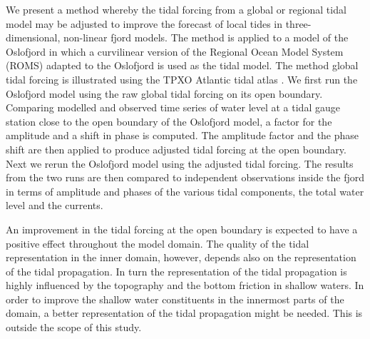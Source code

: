 We present a method whereby the tidal forcing from a global or regional tidal model may be adjusted to improve the forecast of local tides in three-dimensional, non-linear fjord models. 
The method is applied to a model of the Oslofjord in which a curvilinear version of the Regional Ocean Model System (ROMS) \citep{shchepetkin05,shchepetkin09,haidvogel08} adapted to the Oslofjord is used as the tidal model. The method global tidal forcing is illustrated using the TPXO Atlantic tidal atlas \citep{egbert94,egbert02}.
We first run the Oslofjord model using the raw global tidal forcing on its open boundary. Comparing modelled and observed time series of water level at a tidal gauge station close to the open boundary of the Oslofjord model, a factor for the amplitude and a shift in phase is computed. The amplitude factor and the phase shift are then applied to produce adjusted tidal forcing at the open boundary. Next we rerun the Oslofjord model using the adjusted tidal forcing. The results from the two runs are then compared to independent observations inside the fjord in terms of amplitude and phases of the various tidal components, the total water level and the currents.

An improvement in the tidal forcing at the open boundary is expected to have a positive effect throughout the model domain. The quality of the tidal representation in the inner domain, however, depends also on the representation of the tidal propagation. In turn the representation of the tidal propagation is highly influenced by the topography and the bottom friction in shallow waters. In order to improve the shallow water constituents in the innermost parts of the domain, a better representation of the tidal propagation might be needed. This is outside the scope of this study. 
